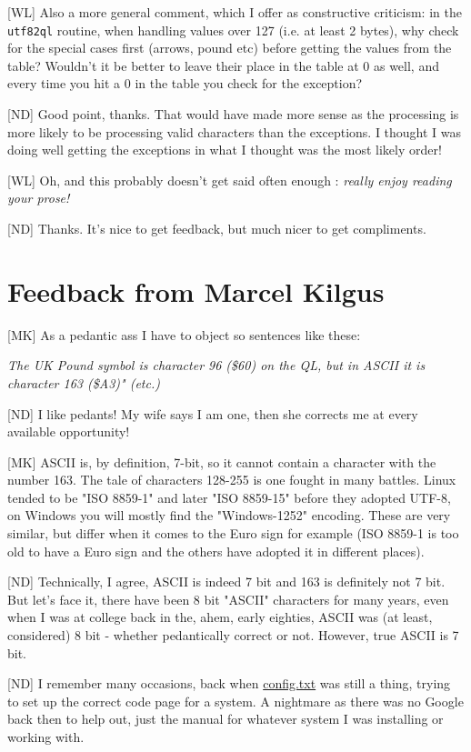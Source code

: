 [WL] Also a more general comment, which I offer as constructive criticism: in the  \texttt{utf82ql} routine, when handling values over 127 (i.e. at least 2 bytes), why check for the special cases first (arrows, pound etc) before getting the values from the table? Wouldn't it be better to leave their place in the table at 0 as well, and every time you hit a 0 in the table you check for the exception?

[ND] Good point, thanks. That would have made more sense as the processing is more likely to be processing valid characters than the exceptions. I thought I was doing well getting the exceptions in what I thought was the most likely order!


[WL] Oh, and this probably doesn't get said often enough : \emph{ really enjoy reading your prose!}

[ND] Thanks. It's nice to get feedback, but much nicer to get compliments. 



\section{Feedback from Marcel Kilgus}

[MK] As a pedantic ass I have to object so sentences like these:

\emph{The UK Pound symbol is character 96 (\$60) on the QL, but in ASCII
it is character 163 (\$A3)" (etc.)}

[ND] I like pedants! My wife says I am one, then she corrects me at every available opportunity!


[MK] ASCII is, by definition, 7-bit, so it cannot contain a character with
the number 163. The tale of characters 128-255 is one fought in many
battles. Linux tended to be "ISO 8859-1" and later "ISO 8859-15"
before they adopted UTF-8, on Windows you will mostly find the
"Windows-1252" encoding. These are very similar, but differ when it
comes to the Euro sign for example (ISO 8859-1 is too old to have a
Euro sign and the others have adopted it in different places).

[ND] Technically, I agree, ASCII is indeed 7 bit and 163 is definitely not 7 bit. But let's face it, there have been 8 bit "ASCII" characters for many years, even when I was at college back in the, ahem, early eighties, ASCII was (at least, considered) 8 bit - whether pedantically correct or not. However, true ASCII is 7 bit.

[ND] I remember many occasions, back when \url{config.txt} was still a thing, trying to set up the correct code page for a system. A nightmare as there was no Google back then to help out, just the manual for whatever system I was installing or working with.

